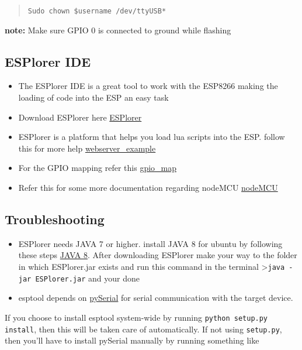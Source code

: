 \documentclass[16pt]{article}
\begin{document}
\begin{quote}
\texttt{Sudo chown \$username /dev/ttyUSB*}
\end{quote}

\textbf{note:} Make sure GPIO 0 is connected to ground while flashing
\vspace{0.5cm}

\subsection{ESPlorer IDE}

\begin{itemize}

\item
  The ESPlorer IDE is a great tool to work with the ESP8266 making the
  loading of code into the ESP an easy task
\item
  Download ESPlorer here
 \href{http://esp8266.ru/esplorer/\#download}{ESPlorer}
\item
  ESPlorer is a platform that helps you load lua scripts into the ESP.
  follow this for more help
  \href{http://randomnerdtutorials.com/esp8266-web-server/}{webserver\_example}
\item
  For the GPIO mapping refer this
  \href{https://github.com/nodemcu/nodemcu-firmware}{gpio\_map}
\item
  Refer this for some more documentation regarding nodeMCU
  \href{http://www.nodemcu.com/docs/}{nodeMCU}
\end{itemize}

\subsection{Troubleshooting}

\begin{itemize}

\item
  ESPlorer needs JAVA 7 or higher. install JAVA 8 for ubuntu by
  following these steps
  \href{http://tecadmin.net/install-oracle-java-8-jdk-8-ubuntu-via-ppa/}{JAVA 8}.
  After downloading ESPlorer make your way to the folder in which
  ESPlorer.jar exists and run this command in the terminal
  \textgreater{}\texttt{java -jar ESPlorer.jar} and your done
\item
  esptool depends on \href{http://pyserial.sourceforge.net/}{pySerial}
  for serial communication with the target device.
\end{itemize}

If you choose to install esptool system-wide by running
\texttt{python setup.py install}, then this will be taken care of
automatically.
If not using \texttt{setup.py}, then you'll have to install pySerial
manually by running something like \\
\end{document}

